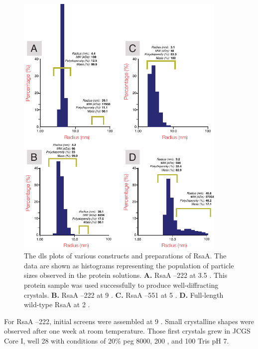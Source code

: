 \begin{figure}[p]
  	\begin{center}
   		\includegraphics[width=0.9\textwidth]{crystal_chapter/img/dls.pdf}
   	\end{center}
   	\caption[\Ac{dls} plots of RsaA constructs]{The \ac{dls} plots of various
      constructs and preparations of RsaA. The data are shown as histograms
      representing the population of particle sizes observed in the protein
      solutions. \textbf{A.} RsaA --222 at 3.5 \mgperml. This protein
      sample was used successfully to produce well-diffracting crystals. \textbf{B.} RsaA --222 at 9 \mgperml. \textbf{C.} RsaA --551 at 5 \mgperml. \textbf{D.} Full-length wild-type RsaA at 2 \mgperml.}
   	\label{fig:dls}
\end{figure}    

 For RsaA --222, initial screens were assembled at 9 \mgperml. Small crystalline shapes were observed after one week at room temperature. Those first crystals grew in JCGS Core I, well 28 with conditions of 20\% \ac{peg} 8000, 200 \millimolar {}, and 100 \millimolar Tris pH 7.
 
